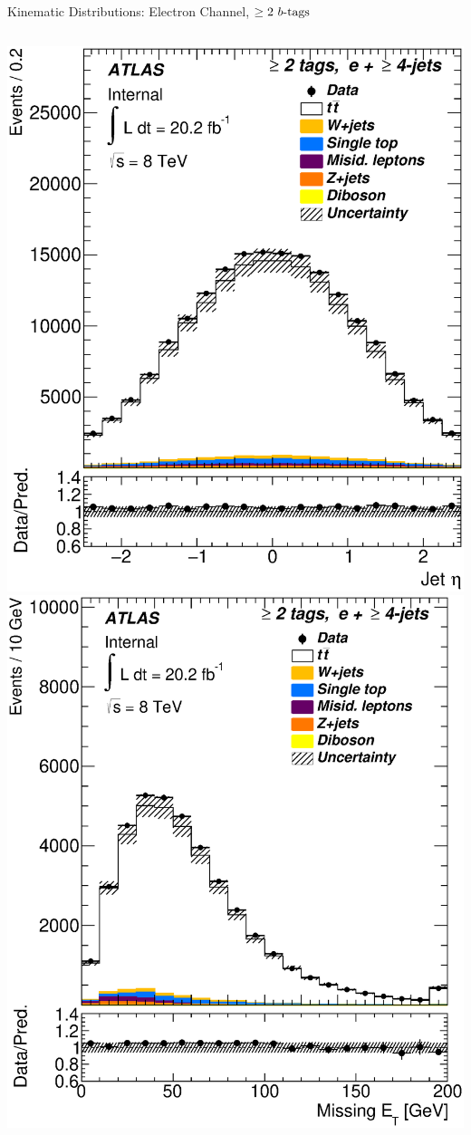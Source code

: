 \documentclass{beamer}
\begin{document}
{\begin{frame}{Kinematic Distributions: Electron Channel, $\geq2\text{ } \lowercase{ b\text{-tags}}$}
\begin{columns}
      \includegraphics[width=.95\textwidth]{../chapters/whel/figures/control_Plots2/bTag_2incl/JetEta_el}
      \includegraphics[width=.95\textwidth]{../chapters/whel/figures/control_Plots2/bTag_2incl/MissingEt_el}\\

\end{columns}
\end{frame}}
\end{document}
